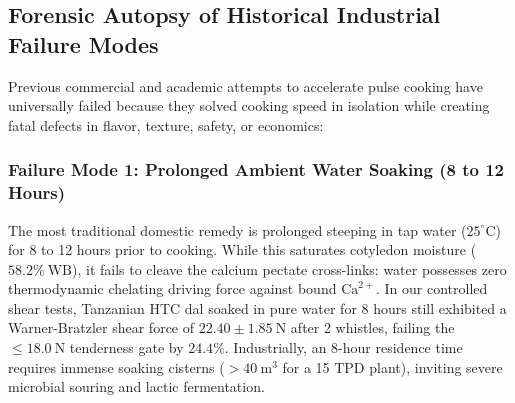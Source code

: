 \documentclass[10pt,a4paper]{article}
\begin{document}
\subsection{Forensic Autopsy of Historical Industrial Failure Modes}
Previous commercial and academic attempts to accelerate pulse cooking have universally failed because they solved cooking speed in isolation while creating fatal defects in flavor, texture, safety, or economics:

\subsubsection{Failure Mode 1: Prolonged Ambient Water Soaking (8 to 12 Hours)}
The most traditional domestic remedy is prolonged steeping in tap water ($25^\circ\mathrm{C}$) for 8 to 12 hours prior to cooking. While this saturates cotyledon moisture ($58.2\%\ \mathrm{WB}$), it fails to cleave the calcium pectate cross-links: water possesses zero thermodynamic chelating driving force against bound $\mathrm{Ca}^{2+}$. In our controlled shear tests, Tanzanian HTC dal soaked in pure water for 8 hours still exhibited a Warner-Bratzler shear force of $22.40 \pm 1.85\ \mathrm{N}$ after 2 whistles, failing the $\le 18.0\ \mathrm{N}$ tenderness gate by $24.4\%$. Industrially, an 8-hour residence time requires immense soaking cisterns ($> 40\ \mathrm{m}^3$ for a 15 TPD plant), inviting severe microbial souring and lactic fermentation.
\end{document}
